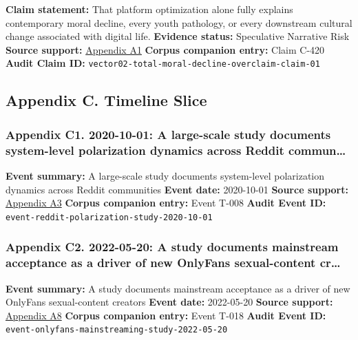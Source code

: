 \documentclass[
  american,
  11pt,
  letterpaper,
]{article}
\begin{document}
\textbf{Claim statement:} That platform optimization alone fully
explains contemporary moral decline, every youth pathology, or every
downstream cultural change associated with digital life.
\textbf{Evidence status:} Speculative Narrative Risk \textbf{Source
support:}
\hyperref[ch-02-appendix-a1-social-media-and-youth-mental-health-the-u-s-surgeon-general-s-advisory]{Appendix
A1} \textbf{Corpus companion entry:} Claim C-420 \textbf{Audit Claim
ID:} \texttt{vector02-total-moral-decline-overclaim-claim-01}

\subsection{Appendix C. Timeline
Slice}\label{appendix-c.-timeline-slice-2}

\subsubsection{Appendix C1. 2020-10-01: A large-scale study documents
system-level polarization dynamics across Reddit
commun\ldots{}}\label{ch-02-appendix-c1-2020-10-01-a-large-scale-study-documents-system-level-polarization-dynamics-across-reddit-communities}

\textbf{Event summary:} A large-scale study documents system-level
polarization dynamics across Reddit communities \textbf{Event date:}
2020-10-01 \textbf{Source support:}
\hyperref[ch-02-appendix-a3-quantifying-social-organization-and-political-polarization-in-online-platforms]{Appendix
A3} \textbf{Corpus companion entry:} Event T-008 \textbf{Audit Event
ID:} \texttt{event-reddit-polarization-study-2020-10-01}

\subsubsection{Appendix C2. 2022-05-20: A study documents mainstream
acceptance as a driver of new OnlyFans sexual-content
cr\ldots{}}\label{ch-02-appendix-c2-2022-05-20-a-study-documents-mainstream-acceptance-as-a-driver-of-new-onlyfans-sexual-content-creators}

\textbf{Event summary:} A study documents mainstream acceptance as a
driver of new OnlyFans sexual-content creators \textbf{Event date:}
2022-05-20 \textbf{Source support:}
\hyperref[ch-02-appendix-a8-nudes-shouldn-t-i-charge-for-these-motivations-of-new-sexual-content-creators-on-onlyfans]{Appendix
A8} \textbf{Corpus companion entry:} Event T-018 \textbf{Audit Event
ID:} \texttt{event-onlyfans-mainstreaming-study-2022-05-20}
\end{document}
